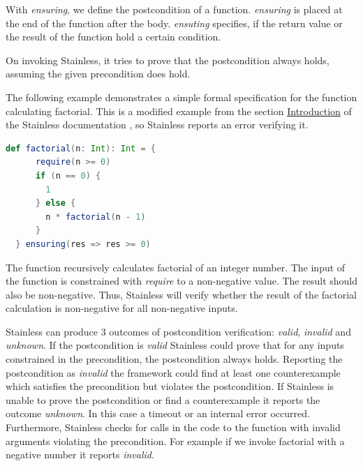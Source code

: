 With \textit{ensuring}, we define the postcondition of a function.
\textit{ensuring} is placed at the end of the function after the body.
\textit{ensuting} specifies, if the return value or the result of the function hold a certain condition.

On invoking Stainless, it tries to prove that the postcondition always holds, assuming the given precondition does hold.

The following example demonstrates a simple formal specification for the function calculating factorial.
This is a modified example from the section \href{https://epfl-lara.github.io/stainless/intro.html}{Introduction} of the Stainless documentation \cite{Stainless:documentation}, so Stainless reports an error verifying it.
\begin{lstlisting}[language=Scala]
  def factorial(n: Int): Int = {
      require(n >= 0)
      if (n == 0) {
        1
      } else {
        n * factorial(n - 1)
      }
  } ensuring(res => res >= 0)
\end{lstlisting}

The function recursively calculates factorial of an integer number.
The input of the function is constrained with \textit{require} to a non-negative value.
The result should also be non-negative.
Thus, Stainless will verify whether the result of the factorial calculation is non-negative for all non-negative inputs.

Stainless can produce 3 outcomes of postcondition verification: \textit{valid}, \textit{invalid} and \textit{unknown}.
If the postcondition is \textit{valid} Stainless could prove that for any inputs constrained in the precondition, the postcondition always holds.
Reporting the postcondition as \textit{invalid} the framework could find at least one counterexample which satisfies the precondition but violates the postcondition.
If Stainless is unable to prove the postcondition or find a counterexample it reports the outcome \textit{unknown}.
In this case a timeout or an internal error occurred.
Furthermore, Stainless checks for calls in the code to the function with invalid arguments violating the precondition.
For example if we invoke factorial with a negative number it reports \textit{invalid}.

